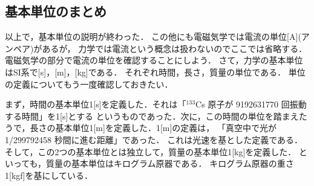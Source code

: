         \subsection{基本単位のまとめ}
            以上で，基本単位の説明が終わった．
            この他にも電磁気学では電流の単位[A](アンペア)があるが，
            力学では電流という概念は扱わないのでここでは省略する．
            電磁気学の部分で電流の単位を確認することにしよう．
            さて，力学の基本単位はSI系で[s]，[m]，[kg]である．
            それぞれ時間，長さ，質量の単位である．
            単位の定義についてもう一度確認しておきたい．

            まず，時間の基本単位1[s]を定義した．それは「$^{133}${\rm Cs} 原子が 9192631770 回振動する時間」を1[s]とする
            というものであった．次に，この時間の単位を踏まえたうで，長さの基本単位1[m]を定義した．1[m]の定義は，
            「真空中で光が 1/299792458 秒間に進む距離」であった．
            これは光速を基とした定義である．
            そして，この2つの基本単位とは独立して，質量の基本単位1[kg]を定義した．
            といっても，質量の基本単位はキログラム原器である．
            キログラム原器の重さ1[kgf]を基にしている．


